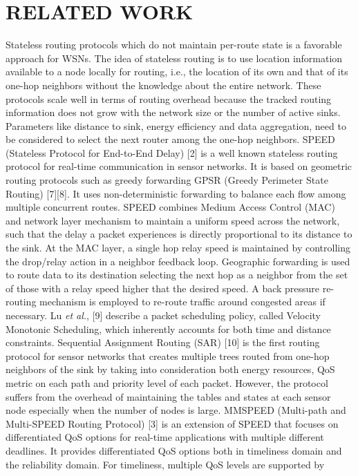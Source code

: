 \documentclass[fleqn,twoside]{article}
\begin{document}
 \section{RELATED WORK}
\label{section:related work}
Stateless routing protocols which do not maintain per-route state is a favorable approach for WSNs. The idea of stateless routing is to use location information available to a node locally for routing, i.e., the location of its own and that of its one-hop neighbors without the knowledge about the entire network. These protocols scale well in terms of routing overhead because the tracked routing information does not grow with the network size
or the number of active sinks. Parameters like distance to sink, energy efficiency and data aggregation, need to be considered to select the next router
among the one-hop neighbors.
\vskip 2mm
SPEED (Stateless Protocol for End-to-End Delay) [2] is a well known stateless routing protocol for real-time communication in sensor networks. It is based on geometric routing protocols
such as greedy forwarding GPSR (Greedy Perimeter State Routing) [7][8]. It uses non-deterministic forwarding to balance each flow among multiple 
concurrent routes. SPEED combines Medium Access Control (MAC) and network layer mechanism to maintain a uniform speed across the 
network, such that the delay a packet experiences is directly proportional to its distance to the sink. At the MAC layer, a single hop relay 
speed is maintained by controlling the drop/relay action in a neighbor feedback loop. Geographic forwarding is used to route data to its destination selecting the next hop as a neighbor from the set of those with a relay speed higher that the desired speed. A back pressure re-routing mechanism is employed to re-route traffic around congested areas if necessary.
\vskip 2mm
 Lu \emph{et al.}, [9] describe a packet scheduling policy, called Velocity Monotonic Scheduling, which inherently accounts for both time and distance constraints.
Sequential Assignment Routing (SAR) [10] is the first routing protocol for sensor networks that creates multiple trees routed from one-hop neighbors of the sink by taking into consideration both energy resources, QoS metric on each path and priority level of each packet. However, the protocol suffers from the overhead of maintaining the tables and states at each sensor node especially when the number of nodes is large.
\vskip 2mm
MMSPEED (Multi-path and Multi-SPEED Routing Protocol) [3] is an extension of SPEED that focuses on differentiated QoS options for real-time applications with multiple different deadlines. It provides differentiated QoS options both in timeliness domain and the reliability domain. For timeliness, multiple QoS levels are supported by
\end{document}
